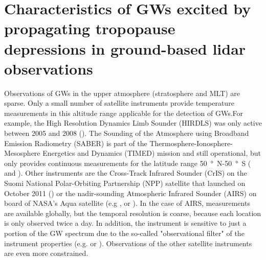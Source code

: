 \chapter{Characteristics of GWs excited by propagating tropopause depressions in ground-based lidar observations}
\label{cha:lidar}

Observations of GWs in the upper atmosphere (stratosphere and MLT) are sparse. Only a small number of satellite instruments provide temperature measurements in this altitude range applicable for the detection of GWs.For example, the High Resolution Dynamics Limb Sounder (HIRDLS) was only active between 2005 and 2008 (\cite[]{gille_high_2008}). The Sounding of the Atmosphere using Broadband Emission Radiometry (SABER) is part of the Thermosphere-Ionosphere-Mesosphere Energetics and Dynamics (TIMED) mission and still operational, but only provides continuous measurements for the latitude range \SI{50}{\degree N}-\SI{50}{\degree S} (\cite[]{mlynczak_energetics_1997} and \cite[]{ern_gracile_2018}). Other instruments are the Cross-Track Infrared Sounder (CrIS) on the Suomi National Polar-Orbiting Partnership (NPP) satellite that launched on October 2011 (\cite[]{goldberg_joint_2013}) or the nadir-sounding Atmospheric Infrared Sounder (AIRS) on board of NASA's Aqua satellite (e.g \cite[]{eckermann_stratospheric_2019}, \cite[]{hindley_gravity_2019} or \cite*[]{hindley_18year_2020}). In the case of AIRS, measurements are available globally, but the temporal resolution is coarse, because each location is only observed twice a day. In addition, the instrument is sensitive to just a portion of the GW spectrum due to the so-called "observational filter" of the instrument properties (e.g. \cite[]{preusse_space-based_2002} or \cite[]{alexander_recent_2010}). Observations of the other satellite instruments are even more constrained. 

